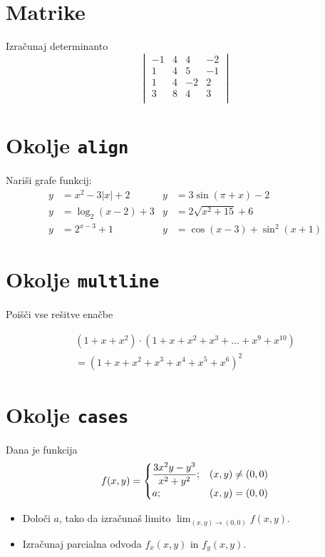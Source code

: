 \documentclass[a4paper,12pt]{article}
\begin{document}
\section*{Matrike}
Izračunaj determinanto
\[
\begin{vmatrix}
   -1 & 4 & 4 & -2 \\
   1 & 4 & 5 & -1 \\
   1 & 4 & -2 & 2 \\
   3 & 8 & 4 & 3 \\
\end{vmatrix}
\]

\section*{Okolje \texttt{align}}
Nariši grafe funkcij:
\begin{align*}
  y &= x^2 - 3|x| + 2    & y &= 3 \sin(\pi+x) - 2\\
  y &= \log_2(x-2) + 3   & y &= 2 \sqrt{x^2+15} + 6\\
  y &= 2^{x-3} + 1       & y &= \cos(x-3) + \sin^2(x+1)
\end{align*}



\section*{Okolje \texttt{multline}}
Poišči vse rešitve enačbe

\begin{multline*}
  \left(1+x+x^2\right)\cdot
  \left(1+x+x^2+x^3+\ldots+x^9+x^{10}\right)\\
  = \left(1+x+x^2+x^3+x^4+x^5+x^6\right)^2
\end{multline*}

\section*{Okolje \texttt{cases}}
Dana je funkcija
\[
 f(x,y) =
 \begin{cases}
   \dfrac{3x^2y-y^3}{x^2+y^2}{; } & \text (x,y)\neq(0,0)\\
   a{; } & \text (x,y) = (0,0)
 \end{cases}
 \]
\begin{itemize}
\item Določi \(a\), tako da izračunaš limito \( \lim_{(x,y)\to(0,0)} f(x,y) \).
\item Izračunaj parcialna odvoda \(f_x(x,y)\) in \(f_y(x,y)\).
\end{itemize}
\end{document}
